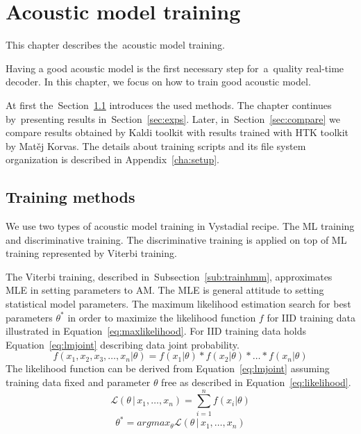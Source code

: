 \chapter{Acoustic model training}
\label{cha:train}

This chapter describes the~acoustic model training.

Having a good acoustic model is the first necessary step for~a~quality real-time decoder.
In this chapter, we focus on how to train good acoustic model.

At first the~Section~\ref{sec:methods} introduces the used methods. 
The chapter continues by~presenting results in~Section~\ref{sec:exps}. 
Later, in~Section~\ref{sec:compare} we compare results obtained by Kaldi toolkit with results
trained with \ac{HTK} toolkit by Matěj Korvas\cite{lrec2014}.
The details about training scripts and its file system organization
is described in Appendix~\ref{cha:setup}.  


\section{Training methods} 
\label{sec:methods}
We use two types of acoustic model training in Vystadial recipe. 
The \acl{ML} training and discriminative training.
The discriminative training is applied on top of \ac{ML} training represented by Viterbi training.

The Viterbi training, described in~Subsection~\ref{sub:trainhmm}, approximates \ac{MLE} in setting parameters to \ac{AM}.
The \ac{MLE} is general attitude to setting statistical model parameters.
The maximum likelihood estimation search for best parameters $\theta^*$ 
in order to maximize the likelihood function $f$ for \ac{IID} training data illustrated in Equation~\ref{eq:maxlikelihood}.
For \ac{IID} training data holds Equation~\ref{eq:lmjoint} describing data joint probability. 
\begin{equation}\label{eq:lmjoint}
    f(x_1, x_2, x_3, \ldots, x_n | \theta) = f(x_1 | \theta) * f(x_2 | \theta) * \ldots * f(x_n | \theta)
\end{equation}
The likelihood function can be derived from Equation~\ref{eq:lmjoint} assuming training data fixed
and parameter $\theta$ free as described in Equation~\ref{eq:likelihood}.
\begin{equation}\label{eq:likelihood}
    \mathcal{L}(\theta\,|\,x_1,\ldots,x_n) = \sum_{i=1}^n f(x_i|\theta)
\end{equation}
\begin{equation}\label{eq:maxlikelihood}
    \theta^* = argmax_{\theta} \mathcal{L}(\theta\,|\,x_1,\ldots,x_n)
\end{equation}


